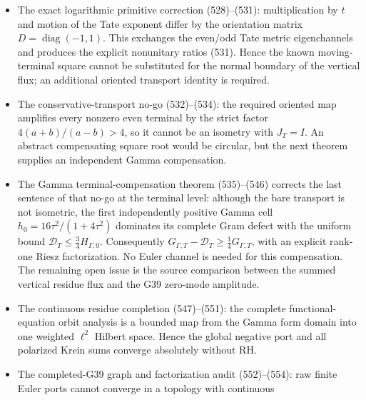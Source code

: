 \documentclass[11pt]{article}
\begin{document}
\begin{itemize}
      support, parity and Tate moments, but the algebraic gauge is not
      automatically a zero mode.  Exact orbit isolation by a compact test is
      impossible.  The new homotopy formula (527) realizes the negative
      residue norm itself as a logarithmic bulk flux; completing the proof
      now requires identifying the globally summed bulk, including its Tate
      correction, with a vanishing G39 zero-mode amplitude.
\item The exact logarithmic primitive correction (528)--(531): multiplication
      by \(t\) and motion of the Tate exponent differ by the orientation
      matrix \(D=\operatorname{diag}(-1,1)\).  This exchanges the even/odd
      Tate metric eigenchannels and produces the explicit nonunitary ratios
      (531).  Hence the known moving-terminal square cannot be substituted
      for the normal boundary of the vertical flux; an additional oriented
      transport identity is required.
\item The conservative-transport no-go (532)--(534): the required oriented
      map amplifies every nonzero even terminal by the strict factor
      \(4(a+b)/(a-b)>4\), so it cannot be an isometry with \(J_T=I\).
      An abstract compensating square root would be circular, but the next
      theorem supplies an independent Gamma compensation.
\item The Gamma terminal-compensation theorem (535)--(546) corrects the last
      sentence of that no-go at the terminal level: although the bare
      transport is not isometric, the first independently positive Gamma
      cell \(h_0=16\tau^2/(1+4\tau^2)\) dominates its complete Gram defect
      with the uniform bound \(\mathcal D_T\le\frac34H_{\Gamma,0}\).
      Consequently \(G_{\Gamma,T}-\mathcal D_T\ge
      \frac14G_{\Gamma,T}\), with an explicit rank-one Riesz
      factorization.  No Euler channel is needed for this compensation.
      The remaining open issue is the source comparison between the summed
      vertical residue flux and the G39 zero-mode amplitude.
\item The continuous residue completion (547)--(551): the complete
      functional-equation orbit analysis is a bounded map from the Gamma
      form domain into one weighted \(\ell^2\) Hilbert space.  Hence the
      global negative port and all polarized Krein sums converge
      absolutely without RH.
\item The completed-G39 graph and factorization audit (552)--(554): raw
      finite Euler ports cannot converge in a topology with continuous

\end{itemize}
\end{document}
